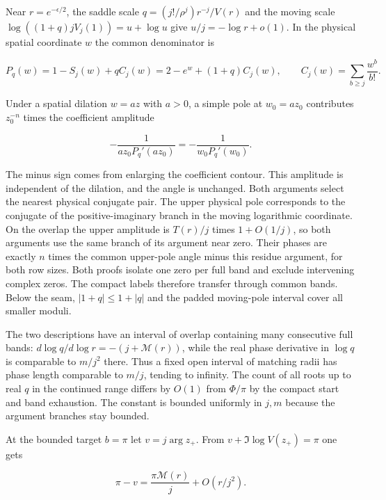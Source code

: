 \documentclass[11pt]{article}
\begin{document}
Near \(r=e^{-\epsilon/2}\), the saddle scale \(q=(j!/\rho^j)r^{-j}/V(r)\) and the moving scale \(\log((1+q)jV_j(1))=u+\log u\) give \(u/j=-\log r+o(1)\). In the physical spatial coordinate \(w\) the common denominator is

\begin{equation*}
P_q(w)=1-S_j(w)+qC_j(w)=2-e^w+(1+q)C_j(w),
\qquad C_j(w)=\sum_{b\ge j}\frac{w^b}{b!}.
\end{equation*}

Under a spatial dilation \(w=az\) with \(a>0\), a simple pole at \(w_0=az_0\) contributes \(z_0^{-n}\) times the coefficient amplitude

\begin{equation*}
-\frac{1}{az_0P_q'(az_0)}=-\frac{1}{w_0P_q'(w_0)}.
\end{equation*}

The minus sign comes from enlarging the coefficient contour. This amplitude is independent of the dilation, and the angle is unchanged. Both arguments select the nearest physical conjugate pair. The upper physical pole corresponds to the conjugate of the positive-imaginary branch in the moving logarithmic coordinate. On the overlap the upper amplitude is \(T(r)/j\) times \(1+O(1/j)\), so both arguments use the same branch of its argument near zero. Their phases are exactly \(n\) times the common upper-pole angle minus this residue argument, for both row sizes. Both proofs isolate one zero per full band and exclude intervening complex zeros. The compact labels therefore transfer through common bands. Below the seam, \(|1+q|\le1+|q|\) and the padded moving-pole interval cover all smaller moduli.

The two descriptions have an interval of overlap containing many consecutive full bands: \(d\log q/d\log r=-(j+\mathcal M(r))\), while the real phase derivative in \(\log q\) is comparable to \(m/j^2\) there. Thus a fixed open interval of matching radii has phase length comparable to \(m/j\), tending to infinity. The count of all roots up to real \(q\) in the continued range differs by \(O(1)\) from \(\Phi/\pi\) by the compact start and band exhaustion. The constant is bounded uniformly in \(j,m\) because the argument branches stay bounded.

At the bounded target \(b=\pi\) let \(v=j\arg z_+\). From \(v+\Im\log V(z_+)=\pi\) one gets

\begin{equation*}
\pi-v=\frac{\pi\mathcal M(r)}j+O(r/j^2).
\end{equation*}
\end{document}
